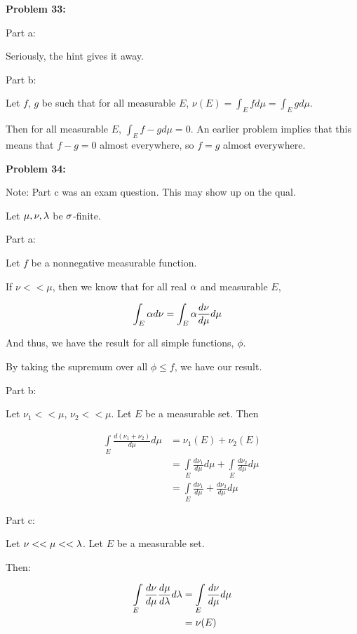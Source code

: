 \documentclass[a4paper,12pt]{article}
\begin{document}
\shunt

{\bf Problem 33:}

Part a:

Seriously, the hint gives it away.

\shunt

Part b:

Let $f$, $g$ be such that for all measurable $E$, $\nu(E) = \int_E f d\mu = \int_E g d\mu$.

Then for all measurable $E$, $\int_E f-g d\mu = 0$. An earlier problem implies that this means that $f-g=0$ almost everywhere, so $f=g$ almost everywhere. 

\shunt

{\bf Problem 34:}

Note: Part c was an exam question. This may show up on the qual.

Let $\mu, \nu, \lambda$ be $\sigma$-finite.

Part a:

Let $f$ be a nonnegative measurable function.

If $\nu << \mu$, then we know that for all real $\alpha$ and measurable $E$,

\begin{align*}
\int_E \alpha d\nu &= \int_E \alpha \frac{d\nu}{d\mu} d\mu
\end{align*}

And thus, we have the result for all simple functions, $\phi$. 

By taking the supremum over all $\phi \leq f$, we have our result. 

\shunt

Part b:

Let $\nu_1 << \mu$, $\nu_2 << \mu$. Let $E$ be a measurable set. Then

\begin{align*}
\int\limits_E \frac{d(\nu_1+\nu_2)}{d\mu} d\mu &= \nu_1(E) + \nu_2(E)\\
&=\int\limits_E \frac{d\nu_1}{d\mu} d\mu+ \int\limits_E\frac{d\nu_2}{d\mu} d\mu\\
&=\int\limits_E \frac{d\nu_1}{d\mu} +\frac{d\nu_2}{d\mu} d\mu
\end{align*}

\shunt

Part c:

Let $\nu << \mu << \lambda$. Let $E$ be a measurable set. 

Then:

\begin{align*}
\int\limits_E \frac{d\nu}{d\mu} \frac{d\mu}{d\lambda} d\lambda &= \int\limits_E \frac{d\nu}{d\mu}  d\mu\\
&= \nu(E)\\
\end{align*}
\end{document}
